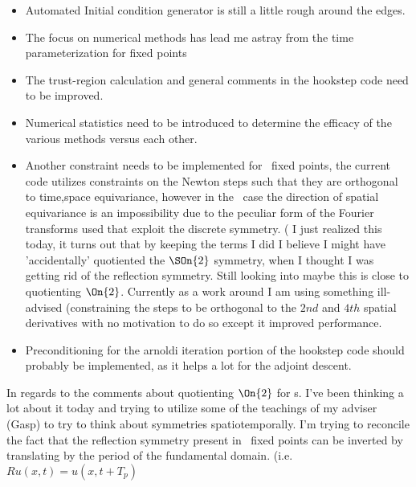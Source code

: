 \begin{description}
{\begin{itemize}
\item Automated Initial condition generator is still a little rough around the edges.
\item The focus on numerical methods has lead me astray from the time parameterization for {\rpo} fixed
points
\item The trust-region calculation and general comments in the hookstep code need to be improved.
\item Numerical statistics need to be introduced to determine the efficacy of the various methods
versus each other.
\item Another constraint needs to be implemented for \ppo\ fixed points, the current code utilizes
constraints on the Newton steps such that they are orthogonal to time,space equivariance, however
in the \ppo\ case the direction of spatial equivariance is an impossibility due to the
peculiar form of the Fourier transforms used that exploit the discrete symmetry. ( I just realized
this today, it turns out that by keeping the terms I did I believe I might have 'accidentally'
quotiented the $\SOn{2}$ symmetry, when I thought I was getting rid of the reflection symmetry.
Still looking into maybe this is close to quotienting $\On{2}$. Currently as a work around I am using
something ill-advised (constraining the steps to be orthogonal to the $2nd$ and $4th$ spatial derivatives
with no motivation to do so except it improved performance.
\item Preconditioning for the arnoldi iteration portion of the hookstep code should probably be
implemented, as it helps a lot for the adjoint descent.
\end{itemize}

In regards to the comments about quotienting $\On{2}$ for {\ppo}s. I've been thinking a lot about it today and
trying to utilize some of the teachings of my adviser (Gasp) to try to think about symmetries spatiotemporally.
I'm trying to reconcile the fact that the reflection symmetry present in \ppo\ fixed points can be inverted by
translating by the period of the fundamental domain. (i.e. $R u(x,t) = u(x,t + T_p)$


}

\end{description}

